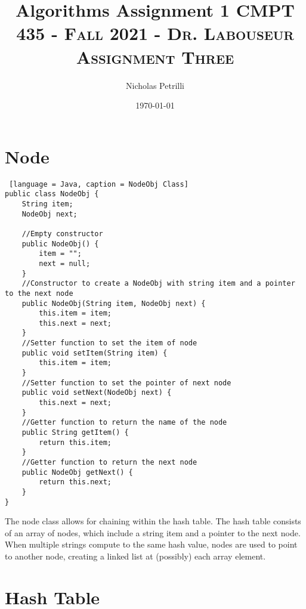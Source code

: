 \documentclass{article}
\title{Algorithms Assignment 1}
\author{Nicholas Petrilli }
\title{	
   \normalfont \normalsize 
   \textsc{CMPT 435 - Fall 2021 - Dr. Labouseur} \\[10pt] %
   \textsc{Assignment Three}
}
\date{\today}
\begin{document}
\lstset{
  numbers=left,
  firstnumber=1,
  numberfirstline=true
}
\maketitle

\section{Node}

\begin{lstlisting} [language = Java, caption = NodeObj Class]
public class NodeObj {
    String item;
    NodeObj next;

    //Empty constructor 
    public NodeObj() {
        item = "";
        next = null;
    }
    //Constructor to create a NodeObj with string item and a pointer to the next node
    public NodeObj(String item, NodeObj next) {
        this.item = item;
        this.next = next;
    }
    //Setter function to set the item of node
    public void setItem(String item) {
        this.item = item;
    }
    //Setter function to set the pointer of next node
    public void setNext(NodeObj next) {
        this.next = next;
    }
    //Getter function to return the name of the node
    public String getItem() {
        return this.item;
    }
    //Getter function to return the next node
    public NodeObj getNext() {
        return this.next;
    }
}
\end{lstlisting}
\noindent The node class allows for chaining within the hash table. The hash table consists of an array of nodes, which include a string item and a pointer to the next node. When multiple strings compute to the same hash value, nodes are used to point to another node, creating a linked list at (possibly) each array element.    

\section{Hash Table}
\end{document}
